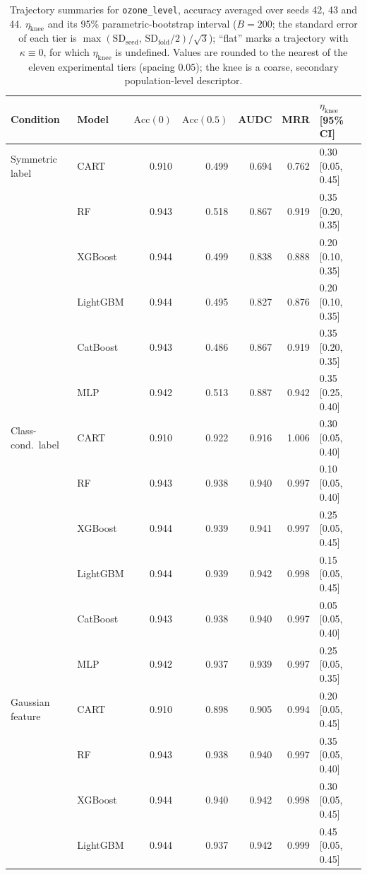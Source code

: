 \documentclass[pdflatex,sn-mathphys]{sn-jnl}
\theoremstyle{thmstyleone}
\begin{document}
\begin{table}[htbp]
\centering
\scriptsize
\setlength{\tabcolsep}{3.5pt}
\caption{Trajectory summaries for \texttt{ozone\_level}, accuracy averaged over seeds 42, 43 and 44. $\eta_{\mathrm{knee}}$ and its 95\% parametric-bootstrap interval ($B=200$; the standard error of each tier is $\max(\mathrm{SD}_{\mathrm{seed}},\,\mathrm{SD}_{\mathrm{fold}}/2)/\sqrt3$); ``flat'' marks a trajectory with $\kappa\equiv 0$, for which $\eta_{\mathrm{knee}}$ is undefined. Values are rounded to the nearest of the eleven experimental tiers (spacing $0.05$); the knee is a coarse, secondary population-level descriptor.}
\label{tab:traj_ozone_level}
\begin{tabular}{@{}llrrrrl@{}}
\toprule
Condition & Model & $\mathrm{Acc}(0)$ & $\mathrm{Acc}(0.5)$ & AUDC & MRR & $\eta_{\mathrm{knee}}$ [95\% CI] \\
\midrule
Symmetric label & CART & 0.910 & 0.499 & 0.694 & 0.762 & 0.30 [0.05, 0.45] \\
 & RF & 0.943 & 0.518 & 0.867 & 0.919 & 0.35 [0.20, 0.35] \\
 & XGBoost & 0.944 & 0.499 & 0.838 & 0.888 & 0.20 [0.10, 0.35] \\
 & LightGBM & 0.944 & 0.495 & 0.827 & 0.876 & 0.20 [0.10, 0.35] \\
 & CatBoost & 0.943 & 0.486 & 0.867 & 0.919 & 0.35 [0.20, 0.35] \\
 & MLP & 0.942 & 0.513 & 0.887 & 0.942 & 0.35 [0.25, 0.40] \\
\midrule
Class-cond.\ label & CART & 0.910 & 0.922 & 0.916 & 1.006 & 0.30 [0.05, 0.40] \\
 & RF & 0.943 & 0.938 & 0.940 & 0.997 & 0.10 [0.05, 0.40] \\
 & XGBoost & 0.944 & 0.939 & 0.941 & 0.997 & 0.25 [0.05, 0.45] \\
 & LightGBM & 0.944 & 0.939 & 0.942 & 0.998 & 0.15 [0.05, 0.45] \\
 & CatBoost & 0.943 & 0.938 & 0.940 & 0.997 & 0.05 [0.05, 0.40] \\
 & MLP & 0.942 & 0.937 & 0.939 & 0.997 & 0.25 [0.05, 0.35] \\
\midrule
Gaussian feature & CART & 0.910 & 0.898 & 0.905 & 0.994 & 0.20 [0.05, 0.45] \\
 & RF & 0.943 & 0.938 & 0.940 & 0.997 & 0.35 [0.05, 0.40] \\
 & XGBoost & 0.944 & 0.940 & 0.942 & 0.998 & 0.30 [0.05, 0.45] \\
 & LightGBM & 0.944 & 0.937 & 0.942 & 0.999 & 0.45 [0.05, 0.45] \\

\end{tabular}
\end{table}
\end{document}
